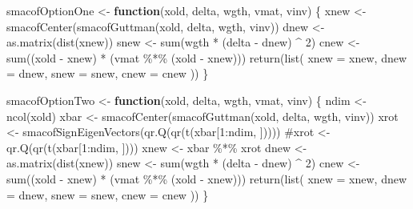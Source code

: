 \documentclass[
  12pt,
  letterpaper,
  DIV=11,
  numbers=noendperiod]{scrartcl}
\newenvironment{Shaded}{\begin{snugshade}}{\end{snugshade}}
\newcommand{\AttributeTok}[1]{\textcolor[rgb]{0.40,0.45,0.13}{#1}}
\newcommand{\CommentTok}[1]{\textcolor[rgb]{0.37,0.37,0.37}{#1}}
\newcommand{\ControlFlowTok}[1]{\textcolor[rgb]{0.00,0.23,0.31}{\textbf{#1}}}
\newcommand{\DecValTok}[1]{\textcolor[rgb]{0.68,0.00,0.00}{#1}}
\newcommand{\FunctionTok}[1]{\textcolor[rgb]{0.28,0.35,0.67}{#1}}
\newcommand{\NormalTok}[1]{\textcolor[rgb]{0.00,0.23,0.31}{#1}}
\newcommand{\OtherTok}[1]{\textcolor[rgb]{0.00,0.23,0.31}{#1}}
\newcommand{\SpecialCharTok}[1]{\textcolor[rgb]{0.37,0.37,0.37}{#1}}
\begin{document}
\begin{Shaded}
\begin{Highlighting}[]
\NormalTok{smacofOptionOne }\OtherTok{\textless{}{-}} \ControlFlowTok{function}\NormalTok{(xold, delta, wgth, vmat, vinv) \{}
\NormalTok{  xnew }\OtherTok{\textless{}{-}} \FunctionTok{smacofCenter}\NormalTok{(}\FunctionTok{smacofGuttman}\NormalTok{(xold, delta, wgth, vinv))}
\NormalTok{  dnew }\OtherTok{\textless{}{-}} \FunctionTok{as.matrix}\NormalTok{(}\FunctionTok{dist}\NormalTok{(xnew))}
\NormalTok{  snew }\OtherTok{\textless{}{-}} \FunctionTok{sum}\NormalTok{(wgth }\SpecialCharTok{*}\NormalTok{ (delta }\SpecialCharTok{{-}}\NormalTok{ dnew) }\SpecialCharTok{\^{}} \DecValTok{2}\NormalTok{)}
\NormalTok{  cnew }\OtherTok{\textless{}{-}} \FunctionTok{sum}\NormalTok{((xold }\SpecialCharTok{{-}}\NormalTok{ xnew) }\SpecialCharTok{*}\NormalTok{ (vmat }\SpecialCharTok{\%*\%}\NormalTok{ (xold }\SpecialCharTok{{-}}\NormalTok{ xnew)))}
  \FunctionTok{return}\NormalTok{(}\FunctionTok{list}\NormalTok{(}
    \AttributeTok{xnew =}\NormalTok{ xnew,}
    \AttributeTok{dnew =}\NormalTok{ dnew,}
    \AttributeTok{snew =}\NormalTok{ snew,}
    \AttributeTok{cnew =}\NormalTok{ cnew}
\NormalTok{  ))}
\NormalTok{\}}

\NormalTok{smacofOptionTwo }\OtherTok{\textless{}{-}} \ControlFlowTok{function}\NormalTok{(xold, delta, wgth, vmat, vinv) \{}
\NormalTok{  ndim }\OtherTok{\textless{}{-}} \FunctionTok{ncol}\NormalTok{(xold)}
\NormalTok{  xbar }\OtherTok{\textless{}{-}} \FunctionTok{smacofCenter}\NormalTok{(}\FunctionTok{smacofGuttman}\NormalTok{(xold, delta, wgth, vinv))}
\NormalTok{  xrot }\OtherTok{\textless{}{-}} \FunctionTok{smacofSignEigenVectors}\NormalTok{(}\FunctionTok{qr.Q}\NormalTok{(}\FunctionTok{qr}\NormalTok{(}\FunctionTok{t}\NormalTok{(xbar[}\DecValTok{1}\SpecialCharTok{:}\NormalTok{ndim, ]))))}
  \CommentTok{\#xrot \textless{}{-} qr.Q(qr(t(xbar[1:ndim, ])))}
\NormalTok{  xnew }\OtherTok{\textless{}{-}}\NormalTok{ xbar }\SpecialCharTok{\%*\%}\NormalTok{ xrot}
\NormalTok{  dnew }\OtherTok{\textless{}{-}} \FunctionTok{as.matrix}\NormalTok{(}\FunctionTok{dist}\NormalTok{(xnew))}
\NormalTok{  snew }\OtherTok{\textless{}{-}} \FunctionTok{sum}\NormalTok{(wgth }\SpecialCharTok{*}\NormalTok{ (delta }\SpecialCharTok{{-}}\NormalTok{ dnew) }\SpecialCharTok{\^{}} \DecValTok{2}\NormalTok{)}
\NormalTok{  cnew }\OtherTok{\textless{}{-}} \FunctionTok{sum}\NormalTok{((xold }\SpecialCharTok{{-}}\NormalTok{ xnew) }\SpecialCharTok{*}\NormalTok{ (vmat }\SpecialCharTok{\%*\%}\NormalTok{ (xold }\SpecialCharTok{{-}}\NormalTok{ xnew)))}
  \FunctionTok{return}\NormalTok{(}\FunctionTok{list}\NormalTok{(}
    \AttributeTok{xnew =}\NormalTok{ xnew,}
    \AttributeTok{dnew =}\NormalTok{ dnew,}
    \AttributeTok{snew =}\NormalTok{ snew,}
    \AttributeTok{cnew =}\NormalTok{ cnew}
\NormalTok{  ))}
\NormalTok{\}}


\end{Highlighting}
\end{Shaded}
\end{document}
